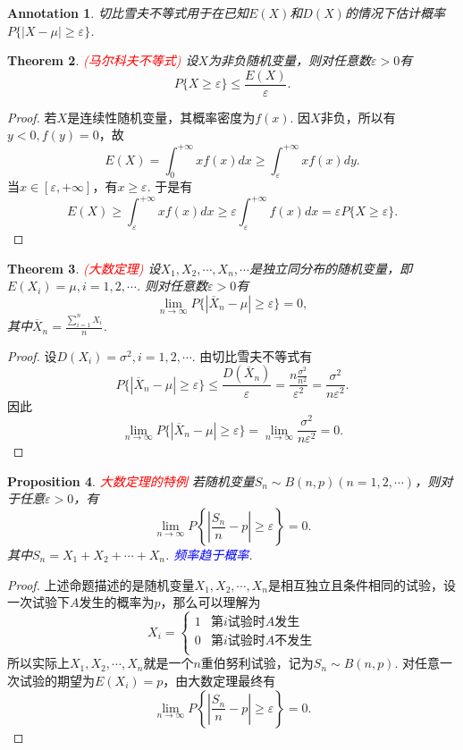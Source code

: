 \documentclass{article}
\newtheorem{theorem}{Theorem}[section]
\newtheorem{proposition}[theorem]{Proposition}
\newtheorem{annotation}[theorem]{Annotation}
\newcommand{\redt}[1]{\textcolor{red}{#1}}
\newcommand{\bluet}[1]{\textcolor{blue}{#1}}
\begin{document}
\begin{annotation}
\rm 切比雪夫不等式用于在已知$E(X)$和$D(X)$的情况下估计概率$P\{|X-\mu|\geq \varepsilon\}$. 
\end{annotation}

\begin{theorem}
\rm \redt{(马尔科夫不等式)} 设$X$为非负随机变量，则对任意数$\varepsilon > 0$有
$$
P\{X \geq \varepsilon\} \leq \frac{E(X)}{\varepsilon}.
$$
\end{theorem}

\begin{proof}
若$X$是连续性随机变量，其概率密度为$f(x)$. 因$X$非负，所以有$y < 0,f(y)=0$，故
$$
E(X) = \int_{0}^{+\infty} xf(x)dx \geq  \int_{\varepsilon}^{+\infty} xf(x)dy.
$$
当$x \in [\varepsilon,+\infty]$，有$x \geq \varepsilon$. 于是有
$$
E(X) \geq \int_{\varepsilon}^{+\infty} xf(x)dx \geq \varepsilon \int_{\varepsilon}^{+\infty}f(x)dx = \varepsilon P\{X \geq \varepsilon\}.
$$
\end{proof}

\begin{theorem}
\rm \redt{(大数定理)} 设$X_1,X_2,\cdots,X_n,\cdots$是独立同分布的随机变量，即$E(X_i) = \mu,i=1,2,\cdots$. 则对任意数$\varepsilon > 0$有
$$
\lim\limits_{n \rightarrow \infty}P\{|\overline{X}_n -\mu| \geq \varepsilon\} = 0,
$$ 
其中$\overline{X}_n = \frac{\sum\limits_{i=1}^n X_i}{n}$. 
\end{theorem}

\begin{proof}
设$D(X_i) = \sigma^2, i =1,2,\cdots$. 由切比雪夫不等式有
$$
P\{|\overline{X}_n -\mu| \geq \varepsilon\} \leq \frac{D(\overline{X}_n)}{\varepsilon} = \frac{n\frac{\sigma^2}{n^2}}{\varepsilon^2} = \frac{\sigma^2}{n\varepsilon^2}. 
$$
因此
$$
\lim\limits_{n \rightarrow \infty} P\{|\overline{X}_n -\mu| \geq \varepsilon\} = \lim\limits_{n \rightarrow \infty} \frac{\sigma^2}{n\varepsilon^2} = 0.
$$
\end{proof}

\begin{proposition}
\rm \redt{大数定理的特例} 若随机变量$S_n \sim B(n,p)(n=1,2,\cdots)$，则对于任意$\varepsilon > 0$，有
$$
\lim\limits_{n \rightarrow \infty}P\left\{\left|\frac{S_n}{n} -p\right| \geq \varepsilon\right\} = 0.
$$
其中$S_n = X_1+X_2+\cdots+X_n$. \bluet{频率趋于概率}. 
\end{proposition}

\begin{proof}
\rm 上述命题描述的是随机变量$X_1,X_2,\cdots,X_n$是相互独立且条件相同的试验，设一次试验下$A$发生的概率为$p$，那么可以理解为
$$
X_i = \left\{  \begin{array}{ll}
1 & \text{第$i$试验时$A$发生}\\
0 & \text{第$i$试验时$A$不发生}\\
\end{array}  \right.
$$ 
所以实际上$X_1,X_2,\cdots,X_n$就是一个$n$重伯努利试验，记为$S_n \sim B(n,p)$. 对任意一次试验的期望为$E(X_i) = p$，由大数定理最终有
$$
\lim\limits_{n \rightarrow \infty}P\left\{\left|\frac{S_n}{n} -p\right| \geq \varepsilon\right\} = 0.
$$ 
\end{proof}
\end{document}
